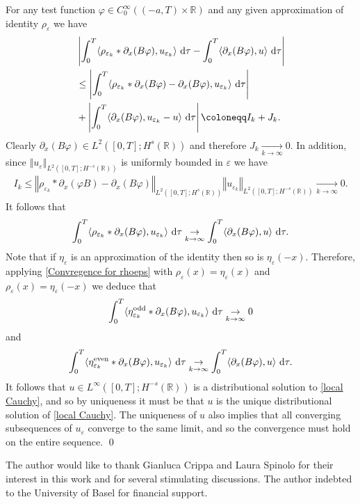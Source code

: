 \documentclass[11pt,reqno]{amsart}
\numberwithin{equation}{section}
\def\dd{{\rm d}}
\begin{document}
For any  test function $\varphi\in C^{\infty}_{0}((-a,T)\times \mathbb{R})$ and any given approximation of identity $\rho_{\varepsilon}$ we have 
\begin{align*}
&\left\vert \int_{0}^{T}\langle \rho_{\varepsilon_{k}}\ast \partial_{x}(B\varphi), u_{\varepsilon_{k}}\rangle\ \dd \tau -\int_{0}^{T}  \langle \partial_{x}(B\varphi), u\rangle \ \dd \tau\right\vert\\
&\leq \left\vert \int_{0}^{T} \langle\rho_{\varepsilon_{k}}\ast \partial_{x}(B\varphi)-\partial_{x}(B\varphi), u_{\varepsilon_{k}}\rangle\ \dd \tau  \right\vert\\
&+\left\vert  \int_{0}^{T} \langle \partial_{x}(B\varphi),u_{\varepsilon_{k}}-u\rangle \ \dd \tau\right\vert\coloneqq I_{k}+J_{k}. 
\end{align*}
Clearly $\partial_{x}(B\varphi)\in L^{2}([0,T];H^{s}(\mathbb{R}))$ and therefore $J_{k}\underset{k \rightarrow \infty}{\rightarrow}0$. In addition, since $\left\Vert u_{\varepsilon}\right\Vert_{L^{2}([0,T];H^{-s}(\mathbb{R}))}$ is uniformly bounded in $\varepsilon$ we have 
\begin{align*}
I_{k}\leq \left\Vert \rho_{\varepsilon_{k}}\ast \partial_{x}(\varphi B)-\partial_{x}(B\varphi)\right\Vert_{L^{2}([0,T];H^{s}(\mathbb{R}))}\left\Vert u_{\varepsilon_{k}}\right\Vert_{L^{2}([0,T];H^{-s}(\mathbb{R}))}\underset{k\rightarrow \infty}{\rightarrow}0.       
\end{align*}
 It follows that
\begin{align}
\int_{0}^{T}\langle \rho_{\varepsilon_{k}}\ast \partial_{x}(B\varphi),u_{\varepsilon_{k}}\rangle\ \dd \tau \underset{k\rightarrow \infty}{\rightarrow}\int_{0}^{T}  \langle \partial_{x}(B\varphi),u \rangle\ \dd \tau. \label{Convregence for rhoeps} \end{align}
Note that if $\eta_{\varepsilon}$ is an approximation of the identity then so is 
$\eta_{\varepsilon}(-x)$. Therefore, applying \eqref{Convregence for rhoeps} with $\rho_{\varepsilon}(x)=\eta_{\varepsilon}(x)$ and $\rho_{\varepsilon}(x)=\eta_{\varepsilon}(-x)$ we deduce that 
\begin{align*}
\int_{0}^{T} \langle \eta_{\varepsilon_{k}}^{\mathrm{odd}}\ast \partial_{x}(B\varphi),u_{\varepsilon_{k}}\rangle \ \dd \tau\underset{k \rightarrow \infty}{\rightarrow} 0    
\end{align*}
and 
\begin{align*}
\int_{0}^{T} \langle \eta_{\varepsilon_{k}}^{\mathrm{even}}\ast \partial_{x}(B\varphi), u_{\varepsilon_{k}}\rangle \ \dd \tau\underset{k\rightarrow \infty}{\rightarrow}\int_{0}^{T} \langle \partial_{x}(B\varphi), u\rangle\ \dd \tau .     
\end{align*}
It follows that $u\in L^{\infty}([0,T];H^{-s}(\mathbb{R}))$ is a distributional solution to \eqref{local Cauchy}, and so by uniqueness it must be that $u$ is the unique distributional solution of \eqref{local Cauchy}. The uniqueness of $u$ also implies that all converging subsequences of $u_{\varepsilon}$ converge to the same limit, and so the convergence must hold on the entire sequence. \qed 
\vspace{0.3cm}

 The author would like to thank Gianluca Crippa and Laura Spinolo for their interest in this work and for several stimulating discussions. The author indebted to the University of Basel for financial support. 



\end{document}
